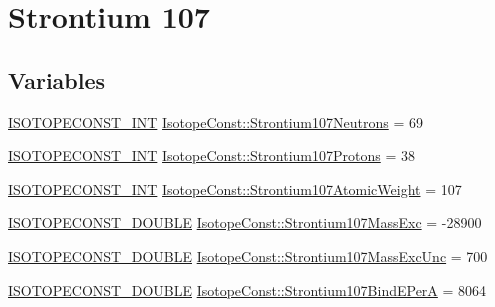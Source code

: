 \hypertarget{group___isotope_const-_strontium-_sr107}{}\section{Strontium 107}
\label{group___isotope_const-_strontium-_sr107}
\subsection*{Variables}
\begin{DoxyCompactItemize}
\item 
\mbox{\hyperlink{group___isotope_const-_macros_ga5f18360b3e99483a35c32d789e62621c}{I\+S\+O\+T\+O\+P\+E\+C\+O\+N\+S\+T\+\_\+\+I\+NT}} \mbox{\hyperlink{group___isotope_const-_strontium-_sr107_ga5f18144ae00097f4f95717a4db533897}{Isotope\+Const\+::\+Strontium107\+Neutrons}} = 69
\item 
\mbox{\hyperlink{group___isotope_const-_macros_ga5f18360b3e99483a35c32d789e62621c}{I\+S\+O\+T\+O\+P\+E\+C\+O\+N\+S\+T\+\_\+\+I\+NT}} \mbox{\hyperlink{group___isotope_const-_strontium-_sr107_ga64c73fe6b17893c3a5f1844fd9244e2f}{Isotope\+Const\+::\+Strontium107\+Protons}} = 38
\item 
\mbox{\hyperlink{group___isotope_const-_macros_ga5f18360b3e99483a35c32d789e62621c}{I\+S\+O\+T\+O\+P\+E\+C\+O\+N\+S\+T\+\_\+\+I\+NT}} \mbox{\hyperlink{group___isotope_const-_strontium-_sr107_ga76fea823980defffa3628589b25b7430}{Isotope\+Const\+::\+Strontium107\+Atomic\+Weight}} = 107
\item 
\mbox{\hyperlink{group___isotope_const-_macros_ga8f45a7272ce02c0b4c65c44636ed719a}{I\+S\+O\+T\+O\+P\+E\+C\+O\+N\+S\+T\+\_\+\+D\+O\+U\+B\+LE}} \mbox{\hyperlink{group___isotope_const-_strontium-_sr107_gaeb87660fe4fe20aa54b8a2df5402dfe5}{Isotope\+Const\+::\+Strontium107\+Mass\+Exc}} = -\/28900
\item 
\mbox{\hyperlink{group___isotope_const-_macros_ga8f45a7272ce02c0b4c65c44636ed719a}{I\+S\+O\+T\+O\+P\+E\+C\+O\+N\+S\+T\+\_\+\+D\+O\+U\+B\+LE}} \mbox{\hyperlink{group___isotope_const-_strontium-_sr107_ga33931c661c065909a4b9b282e84ebf3f}{Isotope\+Const\+::\+Strontium107\+Mass\+Exc\+Unc}} = 700
\item 
\mbox{\hyperlink{group___isotope_const-_macros_ga8f45a7272ce02c0b4c65c44636ed719a}{I\+S\+O\+T\+O\+P\+E\+C\+O\+N\+S\+T\+\_\+\+D\+O\+U\+B\+LE}} \mbox{\hyperlink{group___isotope_const-_strontium-_sr107_ga2397ffa2041972b4c1039569b0c83857}{Isotope\+Const\+::\+Strontium107\+Bind\+E\+PerA}} = 8064
\item 

\end{DoxyCompactItemize}
